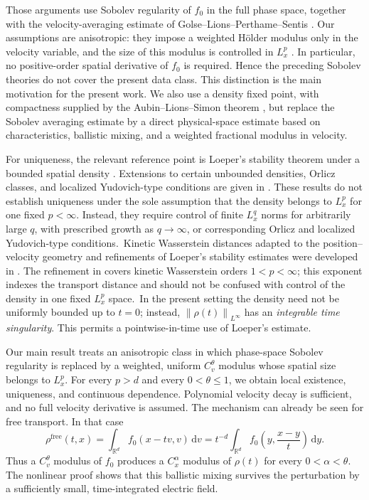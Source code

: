 \documentclass[11pt]{article}
\newcommand{\R}{\mathbb R}
\newcommand{\norm}[1]{\left\lVert #1\right\rVert}
\newcommand{\dd}{\,\mathrm d}
\begin{document}
Those arguments  use  Sobolev regularity of  $f_0$ in the full phase space,
 together with the velocity-averaging  estimate of
 Golse--Lions--Perthame--Sentis  \cite{GLPS}.  Our assumptions are anisotropic:
they impose a weighted H\"older modulus only in the velocity variable, and
the size of this modulus is controlled in  $L^p_x$ .  In particular, no
positive-order  spatial derivative of $f_0$ is  required.  Hence the preceding
Sobolev theories do not cover the present data class.  This distinction  is
the main motivation for the present work.  We also use a density fixed point,
with compactness supplied by the
Aubin--Lions--Simon theorem \cite{Simon}, but replace the Sobolev averaging
estimate by a direct physical-space estimate based on characteristics,
ballistic mixing, and a weighted fractional modulus in velocity.

For uniqueness, the relevant reference point is Loeper's stability theorem
under a bounded spatial density \cite{Loeper}.  Extensions to certain
unbounded densities, Orlicz classes, and localized Yudovich-type conditions
are given in \cite{Uniqueness,HoldingMiot,Yudovich}.
These results do not establish uniqueness under the sole
assumption that the density belongs to $L^p_x$ for one fixed
$p<\infty$.  Instead, they require control of finite $L^q_x$ norms for
arbitrarily large $q$, with prescribed growth as $q\to\infty$, or
corresponding Orlicz and localized Yudovich-type conditions.\
Kinetic Wasserstein
distances adapted to the position--velocity geometry and refinements of
Loeper's stability estimates were developed in
\cite{Iacobelli,IacobelliJunne}.
The refinement in \cite{IacobelliJunne} covers kinetic
Wasserstein orders $1<p<\infty$; this exponent indexes the transport distance
and should not be confused with control of the density in one fixed
$L^p_x$ space.\  In the present setting the density need not
be uniformly bounded up to $t=0$; instead,  $\norm{\rho(t)}_{L^\infty}$ has an
\textit{integrable time singularity}.  This permits a pointwise-in-time use of
Loeper's estimate.

Our main result treats an anisotropic class in which phase-space Sobolev
regularity is replaced by a weighted, uniform $C^\theta_v$ modulus whose
spatial size belongs to $L^p_x$.  For every $p>d$ and every
 $0<\theta\leq1$, we
obtain local existence, uniqueness, and continuous dependence.  Polynomial
velocity decay is sufficient, and no full velocity derivative is assumed.
The mechanism can already be seen for free transport.  In that case
\begin{equation}\label{free-density-intro}
 \rho^{\mathrm{free}}(t,x)
 =\int_{\R^d}f_0(x-tv,v)\dd v
 =t^{-d}\int_{\R^d}f_0\left(y,\frac{x-y}{t}\right)\dd y.
\end{equation}
 Thus a  $C^\theta_v$ modulus of $f_0$
produces a $C^\alpha_x$ modulus of $\rho(t)$ for every
 $0<\alpha<\theta$.  The nonlinear proof shows that this ballistic mixing
survives the perturbation by a sufficiently small, time-integrated electric
field.
\end{document}
